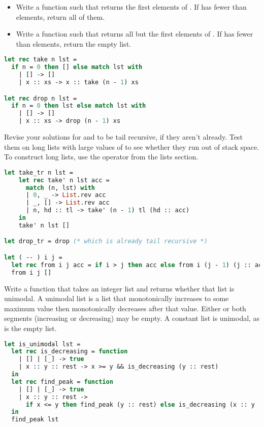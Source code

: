 \begin{itemize}
  \item Write a function  such that  returns the first  elements of . If  has fewer than  elements, return all of them.
  \item Write a function  such that  returns all but the first  elements of . If  has fewer than  elements, return the empty list.
\end{itemize}

\begin{lstlisting}[language=OCaml]
let rec take n lst =
  if n = 0 then [] else match lst with
    | [] -> []
    | x :: xs -> x :: take (n - 1) xs

let rec drop n lst =
  if n = 0 then lst else match lst with
    | [] -> []
    | x :: xs -> drop (n - 1) xs
\end{lstlisting}

Revise your solutions for  and  to be tail recursive, if they aren't already. Test them on long lists with large
values of  to see whether they run out of stack space. To construct long lists, use the \code{-{-}} operator from the lists section.

\begin{lstlisting}[language=OCaml]
let take_tr n lst =
	let rec take' n lst acc =
	  match (n, lst) with
	  | 0, _ -> List.rev acc
	  | _, [] -> List.rev acc
	  | n, hd :: tl -> take' (n - 1) tl (hd :: acc)
	in
	take' n lst []

let drop_tr = drop (* which is already tail recursive *)

let ( -- ) i j =
  let rec from i j acc = if i > j then acc else from i (j - 1) (j :: acc) in
  from i j []
\end{lstlisting}

\problem[unimodal]
Write a function  that takes an integer list and returns whether that list is unimodal. A unimodal list is a list that monotonically increases to some maximum value then monotonically decreases after that value. Either or both segments (increasing or decreasing) may be empty. A constant list is unimodal, as is the empty list.

\begin{lstlisting}[language=Caml]
let is_unimodal lst =
  let rec is_decreasing = function
    | [] | [_] -> true
    | x :: y :: rest -> x >= y && is_decreasing (y :: rest)
  in
  let rec find_peak = function
    | [] | [_] -> true
    | x :: y :: rest ->
      if x <= y then find_peak (y :: rest) else is_decreasing (x :: y :: rest)
  in
  find_peak lst
\end{lstlisting}

